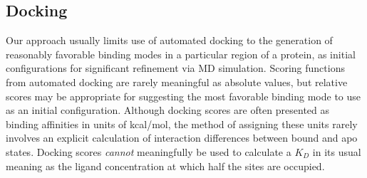 \documentclass[12pt]{article}
\begin{document}
 \subsection{Docking} Our approach usually limits use of automated docking to the generation of reasonably favorable binding modes in a particular region of a protein, as initial configurations for significant refinement via MD simulation.  Scoring functions from automated docking are rarely meaningful as absolute values, but relative scores may be appropriate for suggesting the most favorable binding mode to use as an initial configuration.  Although docking scores are often presented as binding affinities in units of kcal/mol, the method of assigning these units rarely involves an explicit calculation of interaction differences between bound and apo states.  Docking scores \emph{cannot} meaningfully be used to calculate a $K_{D}$ in its usual meaning as the ligand concentration at which half the sites are occupied.  
\end{document}
